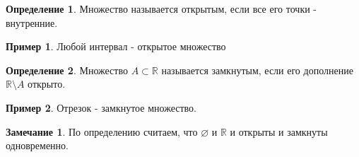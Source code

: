 \documentclass[a4paper, 12pt]{article}
\newcommand{\R}{\mathbb{R}}
\renewcommand{\emptyset}{\varnothing}
\theoremstyle{definition}
\newtheorem*{definition}{Определение}
\newtheorem*{comm}{Замечание}
\newtheorem*{example}{Пример}
\begin{document}
        \begin{definition}
            Множество называется открытым, если все его точки - внутренние.
        \end{definition}
        \begin{example} 
            Любой интервал - открытое множество 
        \end{example}
        \begin{definition}
            Множество $A\subset \R$ называется замкнутым, если его дополнение $\R\setminus A$ открыто.
        \end{definition} 
        \begin{example}
            Отрезок - замкнутое множество.
        \end{example}
        \begin{comm}
            По определению считаем, что $\emptyset$ и $\R$ и открыты и замкнуты одновременно.
        \end{comm} 
\end{document}
